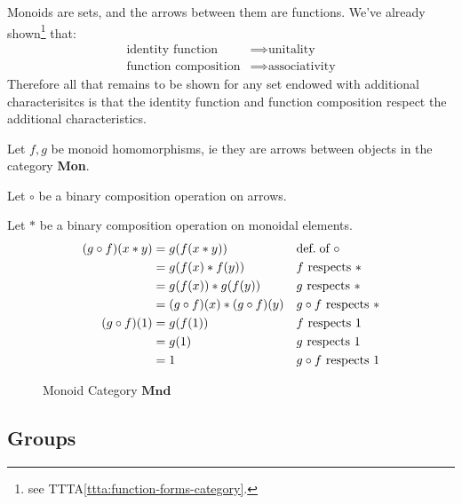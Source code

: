 \begin{proofitem}
	\item Monoids are sets, and the arrows between them are functions. We've already
	shown\footnote{see TTTA\ref{ttta:function-forms-category}.} that:
	\begin{align*}
		\text{identity function}    & \implies\text{unitality}     \\
		\text{function composition} & \implies\text{associativity}
	\end{align*}
	Therefore all that remains to be shown for any set endowed with additional
	characterisitcs is that the identity function and function composition respect
	the additional characteristics.

	\item Let $f, g$ be monoid homomorphisms, ie they are arrows between objects in the category \textbf{Mon}.
	\item Let $\circ$ be a binary composition operation on arrows.
	\item Let $\ast$ be a binary composition operation on monoidal elements.
	\setcounter{equation}{0}
	\begin{align*}
		(g\circ f)(x\ast y) & = g(f(x\ast y))                    &  & \text{def.\;of }\circ         \\
		                    & = g(f(x) \ast f(y))                &  & f\text{ respects }\ast        \\
		                    & = g(f(x)) \ast g(f(y))             &  & g\text{ respects }\ast        \\
		                    & = (g\circ f)(x) \ast (g\circ f)(y) &  & g\circ f\text{ respects }\ast \\
		(g\circ f)(1)       & = g(f(1))                          &  & f\text{ respects }1           \\
		                    & = g(1)                             &  & g \text{ respects }1          \\
		                    & = 1                                &  & g \circ f\text{ respects }1
	\end{align*}
\end{proofitem}
\begin{figure}[H]
	\begin{center}
		
	\end{center}
	\caption{Monoid Category $\mathbf{Mnd}$}
\end{figure}
\subsection{Groups}

